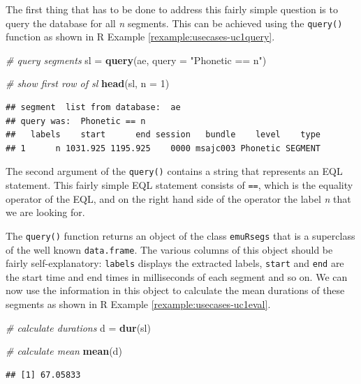 \documentclass[]{book}
\newenvironment{Shaded}{\begin{snugshade}}{\end{snugshade}}
\newcommand{\CommentTok}[1]{\textcolor[rgb]{0.56,0.35,0.01}{\textit{#1}}}
\newcommand{\DataTypeTok}[1]{\textcolor[rgb]{0.13,0.29,0.53}{#1}}
\newcommand{\DecValTok}[1]{\textcolor[rgb]{0.00,0.00,0.81}{#1}}
\newcommand{\KeywordTok}[1]{\textcolor[rgb]{0.13,0.29,0.53}{\textbf{#1}}}
\newcommand{\NormalTok}[1]{#1}
\newcommand{\StringTok}[1]{\textcolor[rgb]{0.31,0.60,0.02}{#1}}
\theoremstyle{definition}
\theoremstyle{definition}
\theoremstyle{definition}
\theoremstyle{remark}
\begin{document}
The first thing that has to be done to address this fairly simple
question is to query the database for all \emph{n} segments. This can be
achieved using the \texttt{query()} function as shown in R Example
\ref{rexample:usecases-uc1query}.

\begin{Shaded}
\begin{Highlighting}[]
\CommentTok{# query segments}
\NormalTok{sl =}\StringTok{ }\KeywordTok{query}\NormalTok{(ae, }\DataTypeTok{query =} \StringTok{"Phonetic == n"}\NormalTok{)}

\CommentTok{# show first row of sl}
\KeywordTok{head}\NormalTok{(sl, }\DataTypeTok{n =} \DecValTok{1}\NormalTok{)}
\end{Highlighting}
\end{Shaded}

\begin{verbatim}
## segment  list from database:  ae 
## query was:  Phonetic == n 
##   labels    start      end session   bundle    level    type
## 1      n 1031.925 1195.925    0000 msajc003 Phonetic SEGMENT
\end{verbatim}

The second argument of the \texttt{query()} contains a string that
represents an EQL statement. This fairly simple EQL statement consists
of \texttt{==}, which is the equality operator of the EQL, and on the
right hand side of the operator the label \emph{n} that we are looking
for.

The \texttt{query()} function returns an object of the class
\texttt{emuRsegs} that is a superclass of the well known
\texttt{data.frame}. The various columns of this object should be fairly
self-explanatory: \texttt{labels} displays the extracted labels,
\texttt{start} and \texttt{end} are the start time and end times in
milliseconds of each segment and so on. We can now use the information
in this object to calculate the mean durations of these segments as
shown in R Example \ref{rexample:usecases-uc1eval}.

\begin{Shaded}
\begin{Highlighting}[]
\CommentTok{# calculate durations}
\NormalTok{d =}\StringTok{ }\KeywordTok{dur}\NormalTok{(sl)}

\CommentTok{# calculate mean}
\KeywordTok{mean}\NormalTok{(d)}
\end{Highlighting}
\end{Shaded}

\begin{verbatim}
## [1] 67.05833
\end{verbatim}
\end{document}

